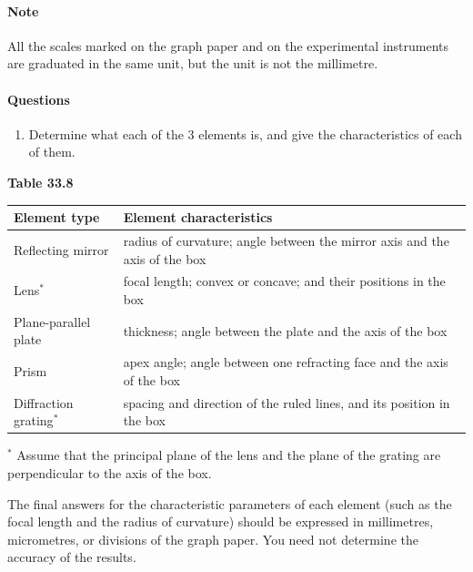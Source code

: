 \paragraph{Note} All the scales marked on the graph paper and on the experimental instruments are graduated in the same unit, but the unit is not the millimetre.

\paragraph{Questions}

\begin{enumerate}[label=(\arabic*)]
\item Determine what each of the 3 elements is, and give the characteristics of each of them.
\end{enumerate}

\begin{center}
\small\textbf{Table 33.8}
\end{center}
\begin{center}
\small
\begin{tabular}{p{3.3cm}p{8.6cm}}
\toprule
Element type & Element characteristics \\
\midrule
Reflecting mirror & radius of curvature; angle between the mirror axis and the axis of the box \\
Lens$^{*}$ & focal length; convex or concave; and their positions in the box \\
Plane-parallel plate & thickness; angle between the plate and the axis of the box \\
Prism & apex angle; angle between one refracting face and the axis of the box \\
Diffraction grating$^{*}$ & spacing and direction of the ruled lines, and its position in the box \\
\bottomrule
\end{tabular}
\end{center}

$^{*}$ Assume that the principal plane of the lens and the plane of the grating are perpendicular to the axis of the box.

The final answers for the characteristic parameters of each element (such as the focal length and the radius of curvature) should be expressed in millimetres, micrometres, or divisions of the graph paper. You need not determine the accuracy of the results.

